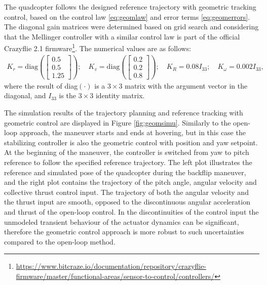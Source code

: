 The quadcopter follows the designed reference trajectory with geometric tracking control, based on the control law \eqref{eq:geomlaw} and error terms \eqref{eq:geomerrors}. The diagonal gain matrices were determined based on grid search and considering that the Mellinger controller \cite{mellinger2011} with a similar control law is part of the official Crazyflie 2.1 firmware\footnote{\url{https://www.bitcraze.io/documentation/repository/crazyflie-firmware/master/functional-areas/sensor-to-control/controllers/}}. The numerical values are as follows:
\begin{align*}
    K_r = \mathrm{diag}\left(\begin{bmatrix}
    0.5 \\ 0.5 \\ 1.25
    \end{bmatrix} \right);\quad K_v = \mathrm{diag}\left(\begin{bmatrix}
    0.2 \\ 0.2 \\ 0.8
    \end{bmatrix} \right);\quad K_R = 0.08 I_{33}; \quad K_\omega = 0.002 I_{33},
\end{align*}
 where the result of diag$(\cdot)$ is a $3\times 3$ matrix with the argument vector in the diagonal, and $I_{33}$ is the $3\times 3$ identity matrix.
 
 The simulation results of the trajectory planning and reference tracking with geometric control are displayed in Figure \ref{fig:geomsimu}. Similarly to the open-loop approach, the maneuver starts and ends at hovering, but in this case the stabilizing controller is also the geometric control with position and yaw setpoint. At the beginning of the maneuver, the controller is switched from yaw to pitch reference to follow the specified reference trajectory. The left plot illustrates the reference and simulated pose of the quadcopter during the backflip maneuver, and the right plot contains the trajectory of the pitch angle, angular velocity and collective thrust control input. The trajectory of both the angular velocity and the thrust input are smooth, opposed to the discontinuous angular acceleration and thrust of the open-loop control. In the discontinuities of the control input the unmodeled transient behaviour of the actuator dynamics can be significant, therefore the geometric control approach is more robust to such uncertainties compared to the open-loop method. 
 
